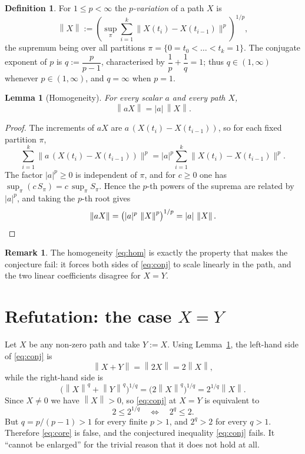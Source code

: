 \documentclass[11pt]{article}
\newtheorem{lemma}[theorem]{Lemma}
\theoremstyle{definition}
\newtheorem{definition}[theorem]{Definition}
\newtheorem{remark}[theorem]{Remark}
\newcommand{\norm}[1]{\left\lVert #1 \right\rVert}
\begin{document}
\begin{definition}\label{def:pvar}
For $1 \le p < \infty$ the \emph{$p$-variation} of a path $X$ is
\begin{equation}\label{eq:def}
  \norm{X}
  := \left( \sup_{\pi} \sum_{i=1}^{k}
       \bigl\lVert X(t_i) - X(t_{i-1}) \bigr\rVert^{p} \right)^{1/p},
\end{equation}
the supremum being over all partitions $\pi = \{0 = t_0 < \dots < t_k = 1\}$.
The conjugate exponent of $p$ is $q := \dfrac{p}{p-1}$, characterised by
$\dfrac1p + \dfrac1q = 1$; thus $q \in (1,\infty)$ whenever
$p \in (1,\infty)$, and $q = \infty$ when $p = 1$.
\end{definition}

\begin{lemma}[Homogeneity]\label{lem:hom}
For every scalar $a$ and every path $X$,
\begin{equation}\label{eq:hom}
  \norm{aX} = |a| \, \norm{X}.
\end{equation}
\end{lemma}

\begin{proof}
The increments of $aX$ are $a\,(X(t_i) - X(t_{i-1}))$, so for each fixed
partition $\pi$,
\[
  \sum_{i=1}^{k} \bigl\lVert a\,(X(t_i) - X(t_{i-1})) \bigr\rVert^{p}
  = |a|^{p} \sum_{i=1}^{k} \bigl\lVert X(t_i) - X(t_{i-1}) \bigr\rVert^{p}.
\]
The factor $|a|^{p} \ge 0$ is independent of $\pi$, and for $c \ge 0$ one has
$\sup_\pi (c\, S_\pi) = c \, \sup_\pi S_\pi$.  Hence the $p$-th powers of the
suprema are related by $|a|^{p}$, and taking the $p$-th root gives
\[
  \norm{aX}
  = \bigl( |a|^{p}\, \norm{X}^{p} \bigr)^{1/p}
  = |a| \, \norm{X}. \qedhere
\]
\end{proof}

\begin{remark}
The homogeneity \eqref{eq:hom} is exactly the property that makes the
conjecture fail: it forces both sides of \eqref{eq:conj} to scale linearly
in the path, and the two linear coefficients disagree for $X = Y$.
\end{remark}

\section{Refutation: the case $X = Y$}

Let $X$ be any non-zero path and take $Y := X$.  Using Lemma~\ref{lem:hom},
the left-hand side of \eqref{eq:conj} is
\[
  \norm{X + Y} = \norm{2X} = 2 \norm{X},
\]
while the right-hand side is
\[
  \bigl(\norm{X}^{q} + \norm{Y}^{q}\bigr)^{1/q}
  = \bigl(2 \norm{X}^{q}\bigr)^{1/q}
  = 2^{1/q} \norm{X}.
\]
Since $X \neq 0$ we have $\norm{X} > 0$, so \eqref{eq:conj} at $X = Y$ is
equivalent to
\begin{equation}\label{eq:core}
  2 \le 2^{1/q}
  \quad\Longleftrightarrow\quad
  2^{q} \le 2 .
\end{equation}
But $q = p/(p-1) > 1$ for every finite $p > 1$, and $2^{q} > 2$ for every
$q > 1$.  Therefore \eqref{eq:core} is false, and the conjectured inequality
\eqref{eq:conj} fails.  It ``cannot be enlarged'' for the trivial reason that
it does not hold at all.
\end{document}
